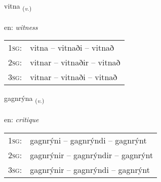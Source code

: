 \documentclass[frontgrid, backgrid]{flacards}\usepackage[]{graphicx}\usepackage[]{color}
\begin{document}
\renewcommand{\flhead}{\vskip5pt \fboxsep=0pt {\small\bfseries\footnotesize Sagnorð | Verb}}
\renewcommand{\fcfoot}{\vskip5pt \fboxsep=0pt \hspace{2pt}{\small\bfseries\footnotesize 2K}}

\renewcommand{\blhead}{\vskip5pt {\small\bfseries\footnotesize Sagnorð | Verb }}
\renewcommand{\bcfoot}{\vskip5pt \hspace{2pt}{\small\bfseries\footnotesize 2K}}


{vitna \small{\textsubscript{(\textit{v.})}} \\[1ex] %
\textphonetic{[vɪhtna]} \\
en: \emph{witness} \\  [2ex]
\renewcommand*{\arraystretch}{0.8}
\begin{tabular}{p{1cm}l}
\textsc{1sg}: & vitna -- vitnaði -- vitnað \\ 
\textsc{2sg}: & vitnar -- vitnaðir -- vitnað \\ 
\textsc{3sg}: & vitnar -- vitnaði -- vitnað \\ 
\end{tabular}
}

\renewcommand{\flhead}{\vskip5pt \fboxsep=0pt {\small\bfseries\footnotesize Sagnorð | Verb}}
\renewcommand{\fcfoot}{\vskip5pt \fboxsep=0pt \hspace{2pt}{\small\bfseries\footnotesize 2K}}

\renewcommand{\blhead}{\vskip5pt {\small\bfseries\footnotesize Sagnorð | Verb }}
\renewcommand{\bcfoot}{\vskip5pt \hspace{2pt}{\small\bfseries\footnotesize 2K}}


{gagnrýna \small{\textsubscript{(\textit{v.})}} \\[1ex] %
\textphonetic{[kakrina]} \\
en: \emph{critique} \\  [2ex]
\renewcommand*{\arraystretch}{0.8}
\begin{tabular}{p{1cm}l}
\textsc{1sg}: & gagnrýni -- gagnrýndi -- gagnrýnt \\ 
\textsc{2sg}: & gagnrýnir -- gagnrýndir -- gagnrýnt \\ 
\textsc{3sg}: & gagnrýnir -- gagnrýndi -- gagnrýnt \\ 
\end{tabular}
}
\end{document}
